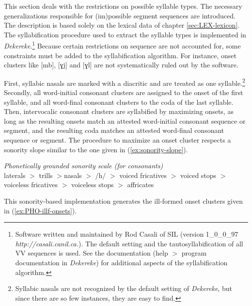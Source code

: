 This section deals with the restrictions on possible syllable types. The
necessary generalizations responsible for (im)possible segment sequences are
introduced.
The description is based solely on  the lexical data of  chapter
\ref{sec:LEX-lexicon}. The syllabification procedure  used to extract the
syllable types is implemented in {\it Dekereke}.\footnote{Software written and
maintained by Rod Casali of SIL (version 1\_0\_0\_97  {\it
http://casali.canil.ca.}). The default setting and the tautosyllabification of
all VV
sequences is used. See the documentation (help $>$ program documentation in {\it
Dekereke}) for additional aspects of the
syllabification
algorithm.} Because certain restrictions on sequence are not accounted for,
some constraints must be added to the syllabification algorithm.  For
instance,  onset clusters like  [mb], [ɣj] and [ɣl] are not systematically ruled
out by the software.

First, syllabic nasals are marked with a diacritic and are treated as one
syllable.\footnote{Syllabic nasals are not recognized by the  default
setting of {\it Dekereke}, but since there are so few instances, they are easy
to find.}  Secondly, all word-initial consonant clusters are assigned to
the onset of the first syllable, and all word-final consonant clusters to the
coda of the last syllable. Then,  intervocalic consonant clusters are
syllabified by maximizing onsets, as long as the resulting onsets match an
attested word-initial consonant sequence or segment, and the resulting coda
matches an attested word-final consonant sequence or segment. The procedure to
maximize an onset cluster respects a sonority slope similar to the one given in
(\ref{ex:sonority-slope}). 


\begin{exe}
\ex\label{ex:sonority-slope}{{\it Phonetically grounded sonority scale (for
consonants)}
\cite[236]{Park02}}\\
 laterals $>$
trills $>$nasals $>$ /h/ $>$ voiced fricatives $>$ voiced stops $>$ voiceless
fricatives $>$ voiceless stops $>$ affricates
\end{exe}

This sonority-based implementation  generates the ill-formed onset clusters
given
in (\ref{ex:PHO-illf-onsets}).  



